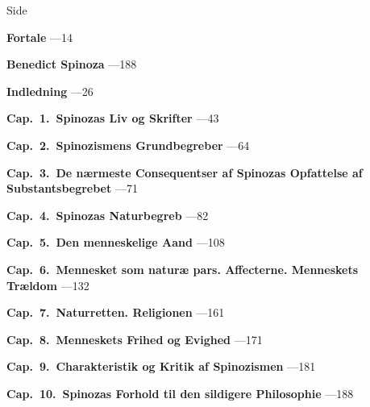 \documentclass[12pt,a4paper]{book}
\begin{document}
\begingroup
{}
\begin{list}{}{%
  \setlength{\leftmargin}{3.6em}\setlength{\itemindent}{-3.6em}%
  \setlength{\itemsep}{2pt}\setlength{\parsep}{0pt}}

\item[] \hfill Side

\item \textbf{Fortale} ---14

\item[] \vspace{2pt}

\item \textbf{Benedict Spinoza} ---188
\item \textbf{Indledning} ---26
\item \textbf{Cap.\ 1.\ Spinozas Liv og Skrifter} ---43
\item \textbf{Cap.\ 2.\ Spinozismens Grundbegreber} ---64
\item \textbf{Cap.\ 3.\ De nærmeste Consequentser af Spinozas Opfattelse af
  Substantsbegrebet} ---71
\item \textbf{Cap.\ 4.\ Spinozas Naturbegreb} ---82
\item \textbf{Cap.\ 5.\ Den menneskelige Aand} ---108
\item \textbf{Cap.\ 6.\ Mennesket som naturæ pars. Affecterne. Menneskets
  Trældom} ---132
\item \textbf{Cap.\ 7.\ Naturretten. Religionen} ---161
\item \textbf{Cap.\ 8.\ Menneskets Frihed og Evighed} ---171
\item \textbf{Cap.\ 9.\ Charakteristik og Kritik af Spinozismen} ---181
\item \textbf{Cap.\ 10.\ Spinozas Forhold til den sildigere Philosophie} ---188

\end{list}
\endgroup

\newpage

\end{document}
